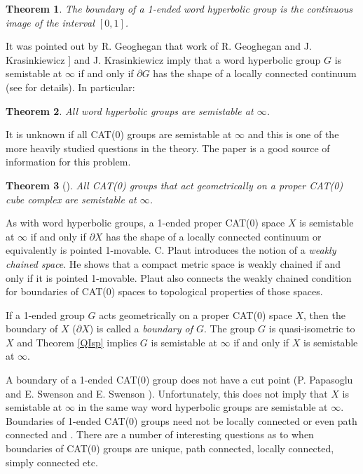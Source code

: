 \documentclass[12pt]{article}
\newtheorem{theorem}{Theorem}[subsection]
\begin{document}
 \begin{theorem} 
 The boundary of a 1-ended word hyperbolic group is the continuous image of the interval $[0,1]$.
 \end{theorem}  
 
 It was pointed out by R. Geoghegan 
 that work of R. Geoghegan and J. Krasinkiewicz \cite{GK91}]  and J. Krasinkiewicz \cite{Kra77} imply that
 a word hyperbolic group $G$ is semistable at $\infty$  if and only if $\partial G$ has the shape of a locally connected continuum (see \cite{GS17} for details).  In particular:
 
\begin{theorem}\label{WHss} 
All word hyperbolic groups are semistable at $\infty$. 
\end{theorem}


It is unknown if all CAT(0) groups are semistable at $\infty$ and this is one of the more heavily studied questions in the theory. The paper \cite{GS17} is a good source of information for this problem. 

\begin{theorem} [\cite{SSh}] \label{CATQ}  All CAT(0) groups that act geometrically on a proper CAT(0) cube complex are semistable at $\infty$.
\end{theorem}
 
As with word hyperbolic groups,  a 1-ended proper CAT(0) space $X$ is semistable at $\infty$ if and only if $\partial X$ has the shape of a locally connected continuum or equivalently is pointed 1-movable.  C. Plaut \cite{Pl22} introduces the notion of a {\it weakly chained space}. He shows that a compact metric space is weakly chained if and only if it is pointed 1-movable.  Plaut \cite{Pl23} also connects the weakly chained condition for boundaries of CAT(0) spaces to topological properties of those spaces. 

If a 1-ended group $G$ acts geometrically on a proper CAT(0) space $X$, then the boundary of $X$ ($\partial X$) is called a {\it boundary of $G$}. The group $G$ is quasi-isometric to $X$ and Theorem \ref{QIsp} implies $G$ is semistable at $\infty$ if and only if $X$ is semistable at $\infty$. 

A boundary of a 1-ended CAT(0) group does not have a cut point (P. Papasoglu and E. Swenson \cite{PS09} and E. Swenson \cite{Sw}). Unfortunately, this does not imply that $X$ is semistable at $\infty$ in the same way word hyperbolic groups are semistable at $\infty$. Boundaries of 1-ended CAT(0) groups need not be locally connected or even path connected \cite{CMT06} and \cite{CK}. There are a number of interesting questions as to when boundaries of CAT(0) groups are unique, path connected, locally connected, simply connected etc. 
\end{document}
